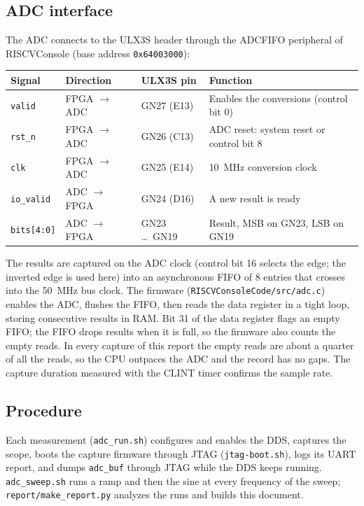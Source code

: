 {\subsection{ADC interface}
The ADC connects to the ULX3S header through the ADCFIFO peripheral of RISCVConsole
(base address \texttt{0x64003000}):
\begin{center}\small
\begin{tabular}{llll}
\toprule
Signal & Direction & ULX3S pin & Function \\
\midrule
\texttt{valid} & FPGA $\to$ ADC & GN27 (E13) & Enables the conversions (control bit 0) \\
\texttt{rst\_n} & FPGA $\to$ ADC & GN26 (C13) & ADC reset: system reset or control bit 8 \\
\texttt{clk} & FPGA $\to$ ADC & GN25 (E14) & \SI{10}{MHz} conversion clock \\
\texttt{io\_valid} & ADC $\to$ FPGA & GN24 (D16) & A new result is ready \\
\texttt{bits[4:0]} & ADC $\to$ FPGA & GN23 \ldots\ GN19 & Result, MSB on GN23, LSB on GN19 \\
\bottomrule
\end{tabular}
\end{center}
The results are captured on the ADC clock (control bit 16 selects the edge; the inverted edge is
used here) into an asynchronous FIFO of 8 entries that crosses into the \SI{50}{MHz} bus clock.
The firmware (\texttt{RISCVConsoleCode/src/adc.c}) enables the ADC, flushes the FIFO, then reads
the data register in a tight loop, storing \AdcSamples{} consecutive results in RAM. Bit 31 of the
data register flags an empty FIFO; the FIFO drops results when it is full, so the firmware also
counts the empty reads. In every capture of this report the empty reads are about a quarter of
all the reads, so the CPU outpaces the ADC and the record has no gaps. The capture duration
measured with the CLINT timer confirms the sample rate.

\subsection{Procedure}
Each measurement (\texttt{adc\_run.sh}) configures and enables the DDS, captures the scope, boots
the capture firmware through JTAG (\texttt{jtag-boot.sh}), logs its UART report, and dumps
\texttt{adc\_buf} through JTAG while the DDS keeps running. \texttt{adc\_sweep.sh} runs a ramp
and then the sine at every frequency of the sweep; \texttt{report/make\_report.py} analyzes the
runs and builds this document.
}
